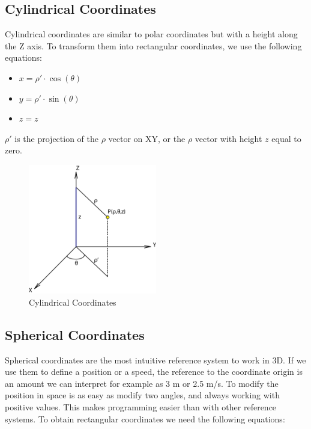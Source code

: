 \documentclass[12pt,a4paper,oneside,english]{book}
\begin{document}
\newpage

\subsection{Cylindrical Coordinates}

Cylindrical coordinates are similar to polar coordinates but with a height along the Z axis. To transform them into rectangular coordinates, we use the following equations:

\begin{itemize}
\item $x=\rho'\cdot\cos(\theta)$
\item $y=\rho'\cdot\sin(\theta)$
\item $z=z$
\end{itemize}

$\rho'$ is the projection of the $\rho$ vector on XY, or the $\rho$ vector with height $z$ equal to zero.

\begin{figure}[htbp]
\begin{center}
\includegraphics[width=0.50\textwidth]{images/CC.png}
\caption{Cylindrical Coordinates}
\label{cylindrical coordinates}
\end{center}
\end{figure}

\newpage

\subsection{Spherical Coordinates}

Spherical coordinates are the most intuitive reference system to work in 3D. If we use them to define a position or a speed, the reference to the coordinate origin is an amount we can interpret for example as 3 m or 2.5 m/s. To modify the position in space is as easy as modify two angles, and always working with positive values. This makes programming easier than with other reference systems. To obtain rectangular coordinates we need the following equations:
\end{document}
